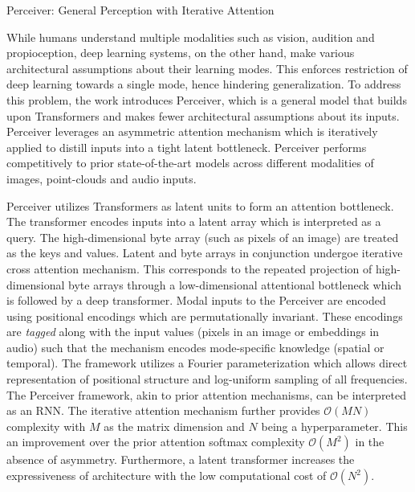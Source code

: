 \documentclass[11pt,letterpaper]{article}
\begin{document}
\begin{center}
  \large{Perceiver: General Perception with Iterative Attention}
\end{center}

While humans understand multiple modalities such as vision, audition and propioception, deep learning systems, on the other hand, make various architectural assumptions about their learning modes. This enforces restriction of deep learning towards a single mode, hence hindering generalization. To address this problem, the work introduces Perceiver, which is a general model that builds upon Transformers and makes fewer architectural assumptions about its inputs. Perceiver leverages an asymmetric attention mechanism which is iteratively applied to distill inputs into a tight latent bottleneck. Perceiver performs competitively to prior state-of-the-art models across different modalities of images, point-clouds and audio inputs.

Perceiver utilizes Transformers as latent units to form an attention bottleneck. The transformer encodes inputs into a latent array which is interpreted as a query. The high-dimensional byte array (such as pixels of an image) are treated as the keys and values. Latent and byte arrays in conjunction undergoe iterative cross attention mechanism. This corresponds to the repeated projection of high-dimensional byte arrays through a low-dimensional attentional bottleneck which is followed by a deep transformer. Modal inputs to the Perceiver are encoded using positional encodings which are permutationally invariant. These encodings are \textit{tagged} along with the input values (pixels in an image or embeddings in audio) such that the mechanism encodes mode-specific knowledge (spatial or temporal). The framework utilizes a Fourier parameterization which allows direct representation of positional structure and log-uniform sampling of all frequencies. The Perceiver framework, akin to prior attention mechanisms, can be interpreted as an RNN. The iterative attention mechanism further provides $\mathcal{O}(MN)$ complexity with $M$ as the matrix dimension and $N$ being a hyperparameter. This an improvement over the prior attention softmax complexity $\mathcal{O}(M^{2})$ in the absence of asymmetry. Furthermore, a latent transformer increases the expressiveness of architecture with the low computational cost of $\mathcal{O}(N^{2})$.
\end{document}
